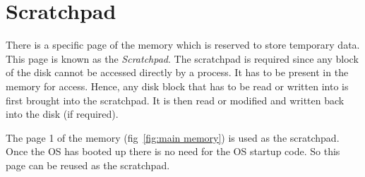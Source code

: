 \documentclass[11pt]{report}
\begin{document}
\section{Scratchpad}
There is a specific page of the memory which is reserved to store temporary data. This page is known as the \textit{Scratchpad}. The scratchpad is required since any block of the disk cannot be accessed directly  by a process. It has to be present in the memory for access. Hence, any disk block that has to be read or written into is first brought into the scratchpad. It is then read or modified and written back into the disk (if required).

The page 1 of the memory (fig~\ref{fig:main memory}) is used as the scratchpad. Once the OS has booted up there is no need for the OS startup code. So this page can be reused as the scratchpad.
\end{document}
